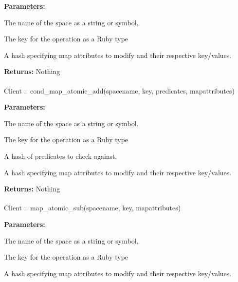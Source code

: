 \noindent\textbf{Parameters:}
\begin{description}[labelindent=\widthof{{mapattributes}},leftmargin=*,noitemsep,nolistsep,align=right]
\item[spacename] The name of the space as a string or symbol.
\item[key] The key for the operation as a Ruby type
\item[mapattributes] A hash specifying map attributes to modify and their respective key/values.
\end{description}

\noindent\textbf{Returns:}
Nothing

\paragraph{}
\begin{ccode}
Client :: cond_map_atomic_add(spacename, key, predicates, mapattributes)
\end{ccode}
\funcdesc 

\noindent\textbf{Parameters:}
\begin{description}[labelindent=\widthof{{mapattributes}},leftmargin=*,noitemsep,nolistsep,align=right]
\item[spacename] The name of the space as a string or symbol.
\item[key] The key for the operation as a Ruby type
\item[predicates] A hash of predicates to check against.
\item[mapattributes] A hash specifying map attributes to modify and their respective key/values.
\end{description}

\noindent\textbf{Returns:}
Nothing

\paragraph{}
\begin{ccode}
Client :: map_atomic_sub(spacename, key, mapattributes)
\end{ccode}
\funcdesc 

\noindent\textbf{Parameters:}
\begin{description}[labelindent=\widthof{{mapattributes}},leftmargin=*,noitemsep,nolistsep,align=right]
\item[spacename] The name of the space as a string or symbol.
\item[key] The key for the operation as a Ruby type
\item[mapattributes] A hash specifying map attributes to modify and their respective key/values.
\end{description}

